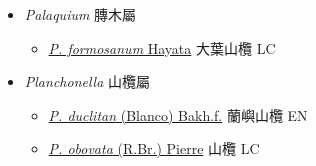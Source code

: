 
  \begin{itemize}
 \item[] \textit{Palaquium} 膞木屬
                                
  \begin{itemize}
        \item[] \href{http://www.theplantlist.org/tpl1.1/search?q=Palaquium+formosanum}{\textit{P. formosanum} Hayata}   大葉山欖   LC
  \end{itemize}
 \item[] \textit{Planchonella} 山欖屬
                                
  \begin{itemize}
        \item[] \href{http://www.theplantlist.org/tpl1.1/search?q=Planchonella+duclitan}{\textit{P. duclitan} (Blanco) Bakh.f.}   蘭嶼山欖   EN
        \item[] \href{http://www.theplantlist.org/tpl1.1/search?q=Planchonella+obovata}{\textit{P. obovata} (R.Br.) Pierre}   山欖   LC
  \end{itemize}
  \end{itemize}
